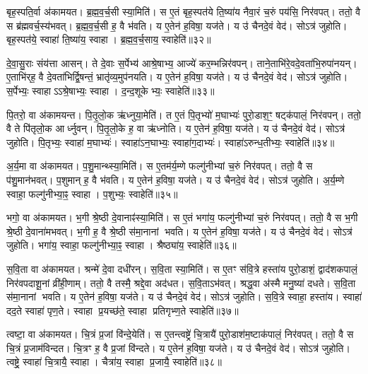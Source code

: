 बृह॒स्पति॒र्वा अ॑कामयत।
ब्र॒ह्म॒व॒र्च॒सी स्या॒मिति॑।
स ए॒तं बृह॒स्पत॑ये ति॒ष्या॑य नैवा॒रं च॒रुं पय॑सि॒ निर॑वपत्।
ततो॒ वै स ब्र॑ह्मवर्च॒स्य॑भवत्।
ब्र॒ह्म॒व॒र्च॒सी ह॒ वै भ॑वति।
य ए॒तेन॑ ह॒विषा॒ यज॑ते।
य उ॑ चैनदे॒वं वेद॑।
सोऽत्र॑ जुहोति।
बृह॒स्पत॑ये॒ स्वाहा॑ ति॒ष्या॑य॒ स्वाहा।
ब्र॒ह्म॒व॒र्च॒साय॒ स्वाहेति॑॥३२॥

दे॒वा॒सु॒राः संय॑त्ता आसन्।
ते दे॒वाः स॒र्पेभ्य॑ आश्रे॒षाभ्य॒ आज्ये॑ कर॒म्भन्निर॑वपन्।
ताने॒ताभि॑रे॒वदे॒वता॑भि॒रुपा॑नयन्।
ए॒ताभि॑र्‌\mbox{}ह॒ वै दे॒वता॑भिर्द्वि॒षन्तं॒ भ्रातृ॑व्य॒मुप॑नयति।
य ए॒तेन॑ ह॒विषा॒ यज॑ते।
य उ॑ चैनदे॒वं वेद॑।
सोऽत्र॑ जुहोति।
स॒र्पेभ्यः॒ स्वाहा\-ऽऽश्रे॒षाभ्यः॒ स्वाहा।
द॒न्द॒शूकेभ्यः॒ स्वाहेति॑॥३३॥

पि॒तरो॒ वा अ॑कामयन्त।
पि॒तृ॒लो॒क ऋ॑ध्नुया॒मेति॑।
त ए॒तं पि॒तृभ्यो॑ म॒घाभ्यः॑ पुरो॒डाश॒ꣳ॒ षट्क॑पालं॒ निर॑वपन्।
ततो॒ वै ते पि॑तृलो॒क आर्ध्नुवन्।
पि॒तृ॒लो॒के ह॒ वा ऋ॑ध्नोति।
य ए॒तेन॑ ह॒विषा॒ यज॑ते।
य उ॑ चैनदे॒वं वेद॑।
सोऽत्र॑ जुहोति।
पि॒तृभ्यः॒ स्वाहा॑ म॒घाभ्यः॑।
स्वाहा॑\-ऽन॒घाभ्यः॒ स्वाहा॑ग॒दाभ्यः॑।
स्वाहा॑\-ऽरुन्ध॒तीभ्यः॒ स्वाहेति॑॥३४॥

अ॒र्य॒मा वा अ॑कामयत।
प॒शु॒मान्थ्स्या॒मिति॑।
स ए॒तम॑र्य॒म्णे फल्गु॑नीभ्यां च॒रुं निर॑वपत्।
ततो॒ वै स प॑शु॒मान॑भवत्।
प॒शुमान् ह॒ वै भ॑वति।
य ए॒तेन॑ ह॒विषा॒ यज॑ते।
य उ॑ चैनदे॒वं वेद॑।
सोऽत्र॑ जुहोति।
अ॒र्य॒म्णे स्वाहा॒ फल्गु॑नीभ्या॒ꣴ॒ स्वाहा।
प॒शुभ्यः॒ स्वाहेति॑॥३५॥

भगो॒ वा अ॑कामयत।
भ॒गी श्रे॒ष्ठी दे॒वानाꣴ॑स्या॒मिति॑।
स ए॒तं भगा॑य॒ फल्गु॑नीभ्यां च॒रुं निर॑वपत्।
ततो॒ वै स भ॒गी श्रे॒ष्ठी दे॒वाना॑मभवत्।
भ॒गी ह॒ वै श्रे॒ष्ठी स॑मा॒नानां भवति।
य ए॒तेन॑ ह॒विषा॒ यज॑ते।
य उ॑ चैनदे॒वं वेद॑।
सोऽत्र॑ जुहोति।
भगा॑य॒ स्वाहा॒ फल्गु॑नीभ्या॒ꣴ॒ स्वाहा।
श्रैष्ठ्या॑य॒ स्वाहेति॑॥३६॥

स॒वि॒ता वा अ॑कामयत।
श्रन्मे॑ दे॒वा दधी॑रन्।
स॒वि॒ता स्या॒मिति॑।
स ए॒तꣳ स॑वि॒त्रे हस्ता॑य पुरो॒डाशं॒ द्वाद॑शकपालं॒ निर॑वपदाशू॒नां व्री॑ही॒णाम्।
ततो॒ वै तस्मै॒ श्रद्दे॒वा अद॑धत।
स॒वि॒ता\-ऽभ॑वत्।
श्रद्ध॒वा अ॑स्मै मनु॒ष्या॑ दधते।
स॒वि॒ता स॑मा॒नानां भवति।
य ए॒तेन॑ ह॒विषा॒ यज॑ते।
य उ॑ चैनदे॒वं वेद॑।
सोऽत्र॑ जुहोति।
स॒वि॒त्रे स्वाहा॒ हस्ता॑य।
स्वाहा॑ दद॒ते स्वाहा॑ पृण॒ते।
स्वाहा प्र॒यच्छ॑ते॒ स्वाहा प्रतिगृभ्ण॒ते स्वाहेति॑॥३७॥

त्वष्टा॒ वा अ॑कामयत।
चि॒त्रं प्र॒जां वि॑न्दे॒येति॑।
स ए॒तन्त्वष्ट्रे॑ चि॒त्रायै॑ पुरो॒डाश॑म॒ष्टाक॑पालं॒ निर॑वपत्।
ततो॒ वै स चि॒त्रं प्र॒जाम॑विन्दत।
चि॒त्रꣳ ह॒ वै प्र॒जां वि॑न्दते।
य ए॒तेन॑ ह॒विषा॒ यज॑ते।
य उ॑ चैनदे॒वं वेद॑।
सोऽत्र॑ जुहोति।
त्वष्ट्रे॒ स्वाहा॑ चि॒त्रायै॒ स्वाहा।
चैत्रा॑य॒ स्वाहा प्र॒जायै॒ स्वाहेति॑॥३८॥

